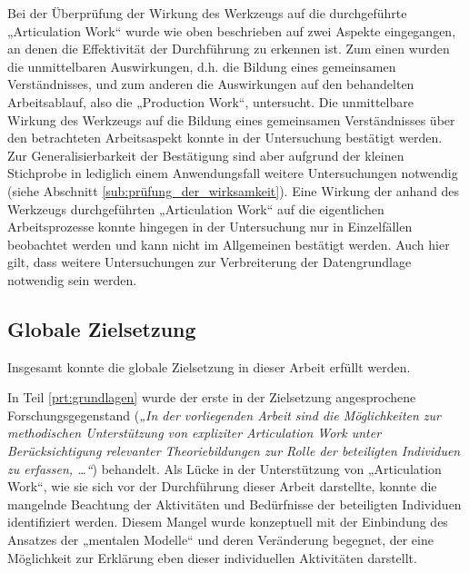 Bei der Überprüfung der Wirkung des Werkzeugs auf die durchgeführte „Articulation Work“ wurde wie oben beschrieben auf zwei Aspekte eingegangen, an denen die Effektivität der Durchführung zu erkennen ist. Zum einen wurden die unmittelbaren Auswirkungen, d.h. die Bildung eines gemeinsamen Verständnisses, und zum anderen die Auswirkungen auf den behandelten Arbeitsablauf, also die „Production Work“, untersucht. Die unmittelbare Wirkung des Werkzeugs auf die Bildung eines gemeinsamen Verständnisses über den betrachteten Arbeitsaspekt konnte in der Untersuchung bestätigt werden. Zur Generalisierbarkeit der Bestätigung sind aber aufgrund der kleinen Stichprobe in lediglich einem Anwendungsfall weitere Untersuchungen notwendig (siehe Abschnitt \ref{sub:prüfung_der_wirksamkeit}). Eine Wirkung der anhand des Werkzeugs durchgeführten „Articulation Work“ auf die eigentlichen Arbeitsprozesse konnte hingegen in der Untersuchung nur in Einzelfällen beobachtet werden und kann nicht im Allgemeinen bestätigt werden. Auch hier gilt, dass weitere Untersuchungen zur Verbreiterung der Datengrundlage notwendig sein werden.

\subsection{Globale Zielsetzung} %
\label{sub:globale_zielsetzung}

Insgesamt konnte die globale Zielsetzung in dieser Arbeit erfüllt werden. 

In Teil \ref{prt:grundlagen} wurde der erste in der Zielsetzung angesprochene Forschungsgegenstand (\emph{„In der vorliegenden Arbeit sind die Möglichkeiten zur methodischen Unterstützung von expliziter Articulation Work unter Berücksichtigung relevanter Theoriebildungen zur Rolle der beteiligten Individuen zu erfassen, \ldots“}) behandelt. Als Lücke in der Unterstützung von „Articulation Work“, wie sie sich vor der Durchführung dieser Arbeit darstellte, konnte die mangelnde Beachtung der Aktivitäten und Bedürfnisse der beteiligten Individuen identifiziert werden. Diesem Mangel wurde konzeptuell mit der Einbindung des Ansatzes der „mentalen Modelle“ und deren Veränderung begegnet, der eine Möglichkeit zur Erklärung eben dieser individuellen Aktivitäten darstellt.

